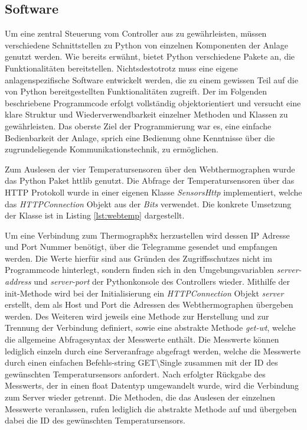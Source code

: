 \subsection{Software}

Um eine zentral Steuerung vom Controller aus zu gewährleisten, müssen verschiedene Schnittstellen zu Python von einzelnen Komponenten der Anlage genutzt werden.
Wie bereits erwähnt, bietet Python verschiedene Pakete an, die Funktionalitäten bereitstellen. Nichtsdestotrotz muss eine eigene anlagenspezifische Software entwickelt werden, die zu einem gewissen Teil auf die von Python bereitgestellten Funktionalitäten zugreift. Der im Folgenden beschriebene Programmcode erfolgt vollständig objektorientiert und versucht eine klare Struktur und Wiederverwendbarkeit einzelner Methoden und Klassen zu gewährleisten. Das oberste Ziel der Programmierung war es, eine einfache Bedienbarkeit der Anlage, sprich eine Bedienung ohne Kenntnisse über die zugrundeliegende Kommunikationstechnik, zu ermöglichen.

Zum Auslesen der vier Temperatursensoren über den Webthermographen wurde das Python Paket httlib genutzt. Die Abfrage der Temperatursensoren über das HTTP Protokoll wurde in einer eigenen Klasse \textit{SensorsHttp} implementiert, welche das \textit{HTTPConnection} Objekt aus der \textit{Bits} verwendet. Die konkrete Umsetzung der Klasse ist in Listing \ref{lst:webtemp} dargestellt.

Um eine Verbindung zum Thermograph8x herzustellen wird dessen IP Adresse und Port Nummer benötigt, über die Telegramme gesendet und empfangen werden. Die Werte hierfür sind aus Gründen des Zugriffsschutzes nicht im Programmcode hinterlegt, sondern finden sich in den Umgebungsvariablen \textit{server-address} und \textit{server-port} der Pythonkonsole des Controllers wieder.
Mithilfe der init-Methode wird bei der Initialisierung ein \textit{HTTPConnection} Objekt \textit{server} erstellt, dem als Host und Port die Adressen des Webthermographen übergeben werden.
Des Weiteren wird jeweils eine Methode zur Herstellung und zur Trennung der Verbindung definiert, sowie eine abstrakte Methode \textit{get-wt}, welche die allgemeine Abfragesyntax der Messwerte enthält. Die Messwerte können lediglich einzeln durch eine Serveranfrage abgefragt werden, welche die Messwerte durch einen einfachen Befehls-string \Gun GET\textbackslash Single \Gob zusammen mit der ID des gewünschten Temperatursensors anfordert. Nach erfolgter Rückgabe des Messwerts, der in einen float Datentyp umgewandelt wurde, wird die Verbindung zum Server wieder getrennt. Die Methoden, die das Auslesen der einzelnen Messwerte veranlassen, rufen lediglich die abstrakte Methode auf und übergeben dabei die ID des gewünschten Temperatursensors.

